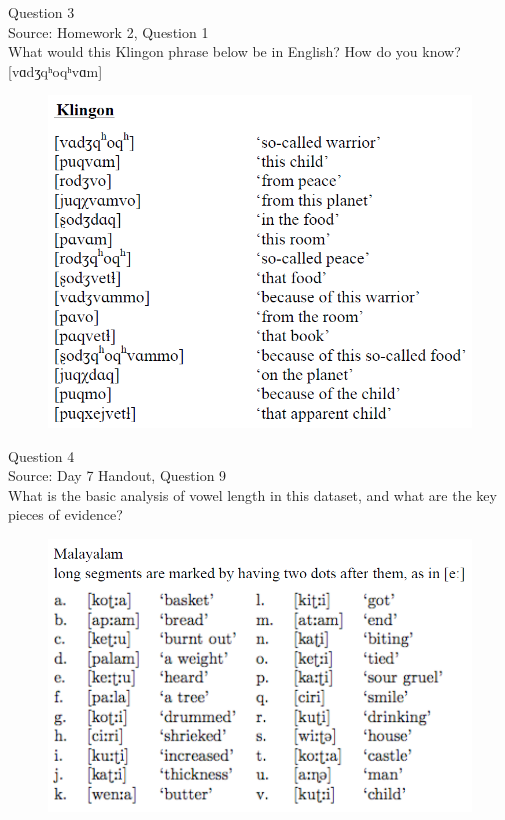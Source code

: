 \documentclass[12pt]{article}
\begin{document}
\newpage

{\large Question 3}\\

Source: Homework 2, Question 1\\

What would this Klingon phrase below be in English? How do you know?\\

{[vɑdʒqʰoqʰvɑm]}

\begin{figure}[H]
\includegraphics{../images/klingon.png}
\end{figure}

\newpage

{\large Question 4}\\

Source: Day 7 Handout, Question 9\\

What is the basic analysis of vowel length in this dataset, and what are the key pieces of evidence?\\

\begin{figure}[H]
\includegraphics{../images/malayalam.png}
\end{figure}
\end{document}
